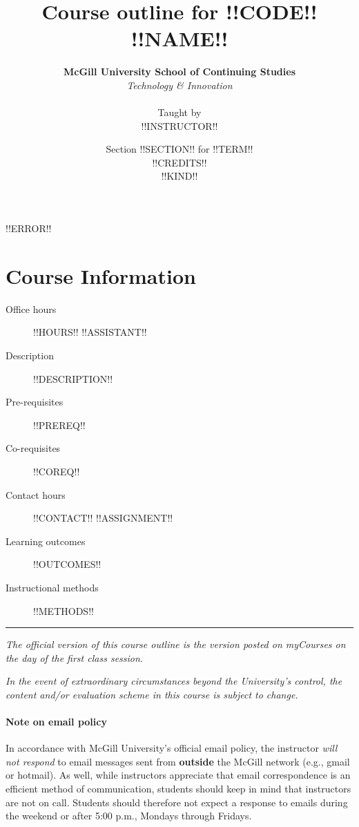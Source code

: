 \documentclass{article}
\title{Course outline for !!CODE!! \\ {\sc !!NAME!!}}
\date{Section !!SECTION!! for !!TERM!! \\ !!CREDITS!! \\ !!KIND!!}
\author{{\bf McGill University School of Continuing Studies} \\
  {\em Technology \& Innovation} \\
  \\ Taught by \\ !!INSTRUCTOR!! }
\begin{document}
\maketitle

\thispagestyle{fancy}

!!ERROR!!

\newpage

\tableofcontents
{}

\newpage

\section{Course Information}

\begin{description}
\item[Office hours]{ !!HOURS!!}
!!ASSISTANT!!
\item[Description]{ !!DESCRIPTION!! }
\item[Pre-requisites]{!!PREREQ!!}
\item[Co-requisites]{!!COREQ!!}
\item[Contact hours]{!!CONTACT!!}
!!ASSIGNMENT!!
\item[Learning outcomes]{ !!OUTCOMES!! }
\item[Instructional methods]{ !!METHODS!! }

\end{description}


\vfill

\hrule
 
{\em The official version of this course outline is the version posted
  on myCourses on the day of the first class session.}

{\em In the event of extraordinary circumstances beyond the
  University's control, the content and/or evaluation scheme in this
  course is subject to change.}

\newpage

\paragraph{Note on email policy}

In accordance with McGill University’s official email
policy, the instructor {\em will not respond} to email messages sent
from {\bf outside} the McGill network (e.g., gmail or hotmail). As
well, while instructors appreciate that email correspondence is an
efficient method of communication, students should keep in mind that
instructors are not on call. Students should therefore not expect a
response to emails during the weekend or after 5:00 p.m., Mondays
through Fridays.
\end{document}
